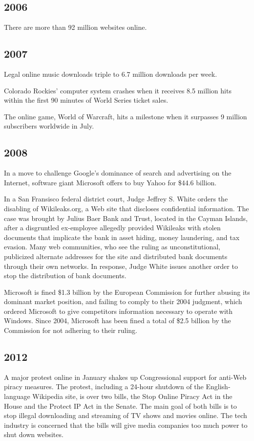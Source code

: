 \documentclass[letterpaper,12pt,english]{sphinxmanual}
\begin{document}
\subsection{2006}
\label{network-timeline:id25}
There are more than 92 million websites online.


\subsection{2007}
\label{network-timeline:id26}
Legal online music downloads triple to 6.7 million downloads per week.

Colorado Rockies' computer system crashes when it receives 8.5 million hits within the first 90 minutes of World Series ticket sales.

The online game, World of Warcraft, hits a milestone when it surpasses 9 million subscribers worldwide in July.


\subsection{2008}
\label{network-timeline:id27}
In a move to challenge Google's dominance of search and advertising on the Internet, software giant Microsoft offers to buy Yahoo for \$44.6 billion.

In a San Fransisco federal district court, Judge Jeffrey S. White orders the disabling of Wikileaks.org, a Web site that discloses confidential information. The case was brought by Julius Baer Bank and Trust, located in the Cayman Islands, after a disgruntled ex-employee allegedly provided Wikileaks with stolen documents that implicate the bank in asset hiding, money laundering, and tax evasion. Many web communities, who see the ruling as unconstitutional, publicized alternate addresses for the site and distributed bank documents through their own networks. In response, Judge White issues another order to stop the distribution of bank documents.

Microsoft is fined \$1.3 billion by the European Commission for further abusing its dominant market position, and failing to comply to their 2004 judgment, which ordered Microsoft to give competitors information necessary to operate with Windows. Since 2004, Microsoft has been fined a total of \$2.5 billion by the Commission for not adhering to their ruling.


\subsection{2012}
\label{network-timeline:id28}
A major protest online in January shakes up Congressional support for anti-Web piracy measures. The protest, including a 24-hour shutdown of the English-language Wikipedia site, is over two bills, the Stop Online Piracy Act in the House and the Protect IP Act in the Senate. The main goal of both bills is to stop illegal downloading and streaming of TV shows and movies online. The tech industry is concerned that the bills will give media companies too much power to shut down websites.
\end{document}
